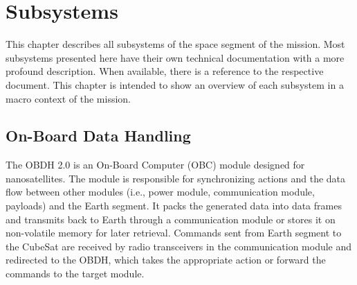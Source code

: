 %
%
%
%
%

%
%
%
%
%
%

\chapter{Subsystems} \label{ch:subsystems}



This chapter describes all subsystems of the space segment of the mission. Most subsystems presented here have their own technical documentation with a more profound description. When available, there is a reference to the respective document. This chapter is intended to show an overview of each subsystem in a macro context of the mission.

\section{On-Board Data Handling}

The OBDH 2.0 is an On-Board Computer (OBC) module designed for nanosatellites. The module is responsible for synchronizing actions and the data flow between other modules (i.e., power module, communication module, payloads) and the Earth segment. It packs the generated data into data frames and transmits back to Earth through a communication module or stores it on non-volatile memory for later retrieval. Commands sent from Earth segment to the CubeSat are received by radio transceivers in the communication module and redirected to the OBDH, which takes the appropriate action or forward the commands to the target module.


